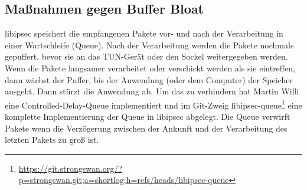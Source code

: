 \subsection{Maßnahmen gegen Buffer Bloat}
libipsec speichert die empfangenen Pakete vor- und nach der Verarbeitung in einer Wartschleife (Queue).
Nach der Verarbeitung werden die Pakete nochmals gepuffert, bevor sie an das TUN-Gerät oder den Sockel
weitergegeben werden. Wenn die Pakete langsamer verarbeitet oder verschickt werden als sie eintreffen,
dann wächst der Puffer, bis der Anwendung (oder dem Computer) der Speicher ausgeht. Dann stürzt die Anwendung ab.
Um das zu verhindern hat Martin Willi eine Controlled-Delay-Queue implementiert und im Git-Zweig libipsec-queue\footnote{\url{https://git.strongswan.org/?p=strongswan.git;a=shortlog;h=refs/heads/libipsec-queue}} eine komplette Implementierung der Queue in libipsec abgelegt.
Die Queue verwirft Pakete wenn die Verzögerung zwischen der Ankunft und der Verarbeitung
des letzten Pakets zu groß ist.

